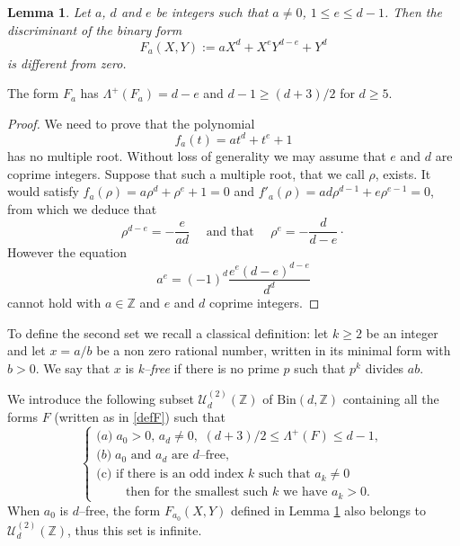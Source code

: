 \documentclass[10pt]{article}
\newtheorem{lemma}[theorem]{Lemma}
\theoremstyle{definition}
\numberwithin{equation}{section}
\newcommand {\Z}{{\mathbb{Z}}}
\newcommand{\Bin}{\mathrm {Bin}}
\begin{document}
\begin{lemma}\label{Lemma:DiscriminantTrinomes} 
Let $a$, $d$ and $e$ be integers such that $a\not=0$, $1\leqslant e\leqslant d-1$. Then the discriminant of the binary form 
\[
F_a(X,Y):=aX^d+X^eY^{d-e} +Y^d
\]
is different from zero.
\end{lemma} 

The form $F_a$ has $\Lambda^+(F_a)=d-e$ and $d-1\geqslant (d+3)/2$ for $d\geqslant 5$. 

\begin{proof}
We need to prove that the polynomial 
\begin{equation}\label{Equation:392}
f_a (t) = a t^d +t^e+1
\end{equation} 
has no multiple root. Without loss of generality we may assume that $e$ and $d$ are coprime integers. 
Suppose that such a multiple root, that we call $\rho$, exists. It would satisfy $f_a(\rho)=a\rho^d + \rho^e +1= 0$ and $f'_a(\rho)= a d \rho^{d-1} +e\rho^{e-1}=0$, from which we deduce that 
\[
\rho^{d-e}=-\frac e {ad}
\quad\text{ 
and that 
}\quad
\rho^e= - \frac d{{d-e}}\cdotp
\]
However the equation 
\[
a^e=(-1)^d \frac{e^e(d-e)^{d-e}}{d^d}
\]
cannot hold with $a\in\Z$ and $e$ and $d$ coprime integers. 
\end{proof}

 
To define the second set we recall a classical definition: let $k\geqslant 2$ be an integer and let $x= a/b$ be a non zero rational number, written in its minimal form with $b>0$. We say that $x$ is {\em k--free } if there is no prime $p$ such that $p^k$ divides $ab$.

\noindent 
We introduce the following subset $\mathcal U_d^{(2)} (\Z)$ of $\Bin  (d, \Z)$ containing all the forms $F$ (written as in \eqref{defF}) such that
\begin{equation}\label{defUd2}
\begin{cases}
{\mathrm (a)}\;
a_0>0, \,a_d\not=0, \,
 \, (d+3)/2\leqslant \Lambda^+ (F) \leqslant d-1,\, 
\\
{\mathrm (b)}\;
 a_0 \text{ and } a_d\text{ are } d\text{--free},\\
 \text{(c) if there is an odd index } k \text{ such that } a_k \neq 0\\
 \qquad\text{ then for the smallest such } k \text{ we have } a_k >0.
\end{cases}
\end{equation} 
When $a_0$ is $d$--free, the form $F_{a_0} (X,Y) $ defined in Lemma \ref{Lemma:DiscriminantTrinomes} also belongs to $\mathcal U_d^{(2)} (\Z)$, thus this set is infinite.
\end{document}
